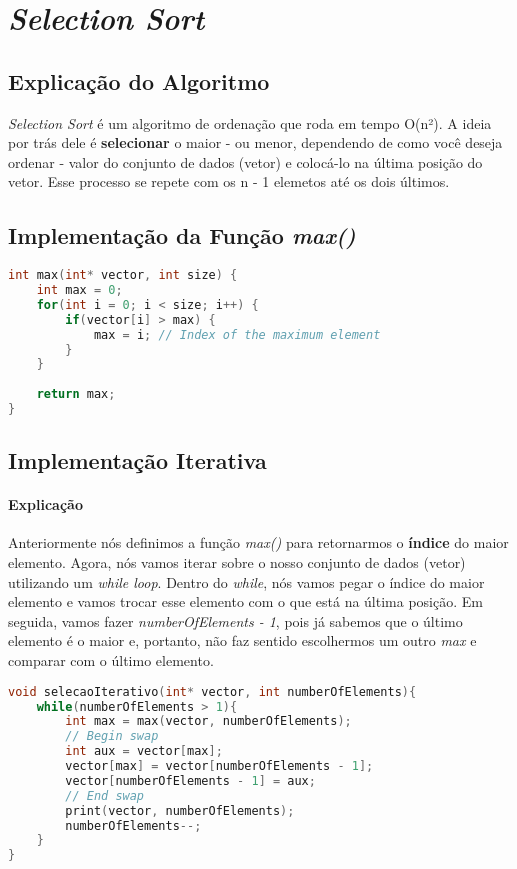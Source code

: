 \section{\textit{Selection Sort}}

\subsection{Explicação do Algoritmo}
\textit{Selection Sort} é um algoritmo de ordenação que roda em tempo O(n²). A ideia por trás dele é \textbf{selecionar} o maior - ou menor, dependendo de como você deseja ordenar - 
valor do conjunto de dados (vetor) e colocá-lo na última posição do vetor. Esse processo se repete com os n - 1 elemetos até os dois últimos.

\subsection{Implementação da Função \textit{max()}}
\begin{lstlisting}[language=C]
int max(int* vector, int size) {
    int max = 0;
    for(int i = 0; i < size; i++) {
        if(vector[i] > max) {
            max = i; // Index of the maximum element
        }
    }
    
    return max;
}
\end{lstlisting}

\subsection{Implementação Iterativa}
\paragraph{Explicação}
Anteriormente nós definimos a função \textit{max()} para retornarmos o \textbf{índice} do maior elemento. Agora, nós vamos iterar sobre o nosso conjunto de dados (vetor) utilizando
um \textit{while loop}. Dentro do \textit{while}, nós vamos pegar o índice do maior elemento e vamos trocar esse elemento com o que está na última posição. Em seguida, vamos fazer
\textit{numberOfElements - 1}, pois já sabemos que o último elemento é o maior e, portanto, não faz sentido escolhermos um outro \textit{max} e comparar com o último elemento.
\begin{lstlisting}[language=C]
void selecaoIterativo(int* vector, int numberOfElements){
    while(numberOfElements > 1){
        int max = max(vector, numberOfElements);
        // Begin swap
        int aux = vector[max];
        vector[max] = vector[numberOfElements - 1];
        vector[numberOfElements - 1] = aux;
        // End swap
        print(vector, numberOfElements);
        numberOfElements--;
    }
}
\end{lstlisting}

